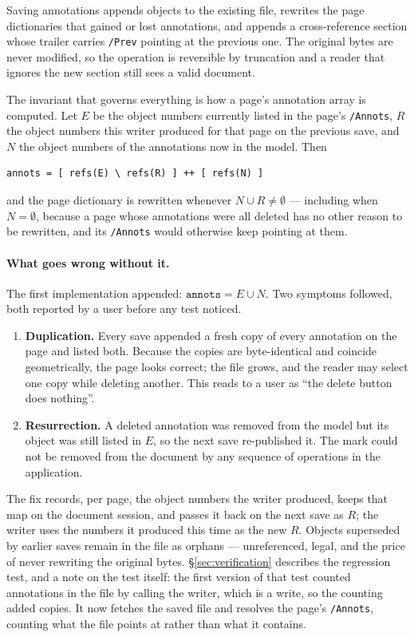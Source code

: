 Saving annotations appends objects to the existing file, rewrites the page dictionaries that
gained or lost annotations, and appends a cross-reference section whose trailer carries
\texttt{/Prev} pointing at the previous one. The original bytes are never modified, so the
operation is reversible by truncation and a reader that ignores the new section still sees a
valid document.

The invariant that governs everything is how a page's annotation array is computed. Let
$E$ be the object numbers currently listed in the page's \texttt{/Annots}, $R$ the object
numbers this writer produced for that page on the previous save, and $N$ the object numbers
of the annotations now in the model. Then

\begin{lstlisting}[language={}]
annots = [ refs(E) \ refs(R) ] ++ [ refs(N) ]
\end{lstlisting}

\noindent
and the page dictionary is rewritten whenever $N \cup R \neq \emptyset$ --- including when
$N = \emptyset$, because a page whose annotations were all deleted has no other reason to be
rewritten, and its \texttt{/Annots} would otherwise keep pointing at them.

\paragraph{What goes wrong without it.} The first implementation appended:
$\texttt{annots} = E \cup N$. Two symptoms followed, both reported by a user before any test
noticed.

\begin{enumerate}
  \item \textbf{Duplication.} Every save appended a fresh copy of every annotation on the page
        and listed both. Because the copies are byte-identical and coincide geometrically,
        the page looks correct; the file grows, and the reader may select one copy while
        deleting another. This reads to a user as ``the delete button does nothing''.
  \item \textbf{Resurrection.} A deleted annotation was removed from the model but its object
        was still listed in $E$, so the next save re-published it. The mark could not be
        removed from the document by any sequence of operations in the application.
\end{enumerate}

The fix records, per page, the object numbers the writer produced, keeps that map on the
document session, and passes it back on the next save as $R$; the writer uses the numbers it
produced this time as the new $R$. Objects superseded by earlier saves remain in the file as
orphans --- unreferenced, legal, and the price of never rewriting the original bytes.
\S\ref{sec:verification} describes the regression test, and a note on the test itself: the
first version of that test counted annotations in the file by calling the writer, which is a
write, so the counting added copies. It now fetches the saved file and resolves the page's
\texttt{/Annots}, counting what the file points at rather than what it contains.


